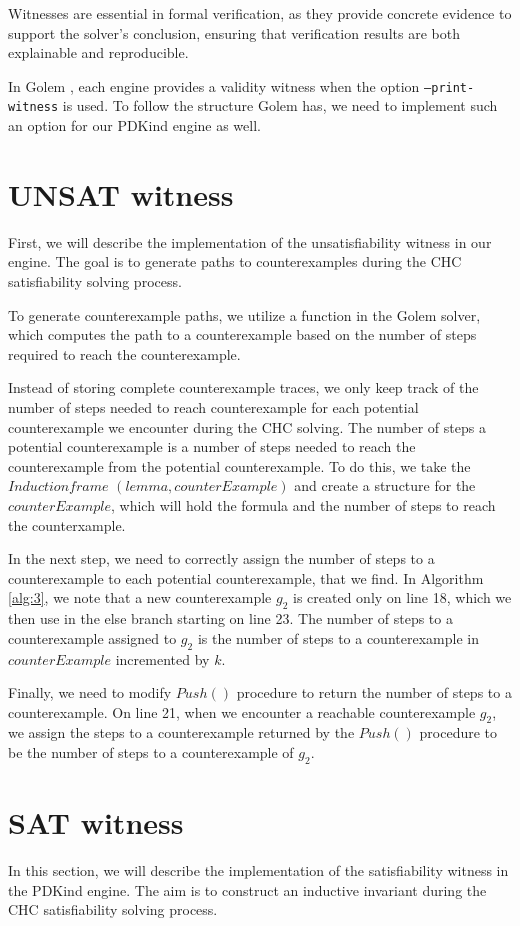 Witnesses are essential in formal verification, as they provide concrete evidence to support the solver's conclusion, ensuring that verification results are both explainable and reproducible.

In Golem \cite{blicha_golem_2023}, each engine provides a validity witness when
the option \texttt{--print-witness} is used. To follow the structure Golem has,
we need to implement such an option for our PDKind engine as well.

\section*{UNSAT witness} \label{UNSATWit}
\noindent First, we will describe the implementation of the unsatisfiability
witness in our engine. The goal is to generate paths to counterexamples during
the CHC satisfiability solving process.

To generate counterexample paths, we utilize a function in the Golem solver, which computes the
path to a counterexample based on the number of steps required to reach the
counterexample.

Instead of storing complete counterexample traces, we only keep track of the number of steps needed
to reach counterexample for each potential counterexample we encounter during the CHC
solving. The number of steps a potential counterexample
is a number of steps needed to reach the counterexample from the potential
counterexample. To do this, we take the \( Induction frame \)
\( (lemma, counterExample) \) and create a structure for the
\( counterExample \), which will hold the formula and the number of steps to reach the
counterxample.

In the next step, we need to correctly assign the number of steps to a
counterexample to each potential counterexample, that we find. In Algorithm
\ref{alg:3}, we note that a new counterexample
$g_2$ is created only on line 18, which we then use in the else branch
starting on line 23. The number of steps to a counterexample assigned to
$g_2$ is the number of steps to a counterexample in $counterExample$ incremented by \( k \).

Finally, we need to modify \( Push() \) procedure to return the number of steps to a
counterexample. On line 21, when we encounter a reachable counterexample
$g_2$, we assign the steps to a counterexample returned by
the \( Push() \) procedure to be the number of steps to a counterexample of $g_2$.

\section*{SAT witness}
\noindent In this section, we will describe the implementation of the
satisfiability witness in the PDKind engine. The aim is to construct an
inductive invariant during the CHC satisfiability solving process.

